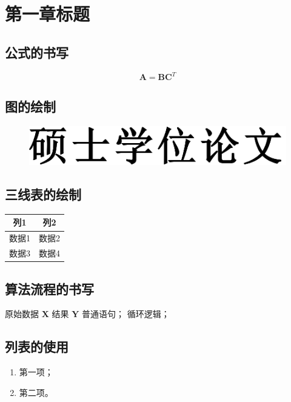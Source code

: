 \chapter{第一章标题}\label{chap:1}

\section{公式的书写}

\begin{equation}\label{eq:example}
    \mathbf{A} = \mathbf{B} \mathbf{C}^T
\end{equation}

\section{图的绘制}

\begin{figure}[H]
    \centering
    \includegraphics*[width=0.7\linewidth]{Figure/master-hwzs.pdf}
\end{figure}

\section{三线表的绘制}

\begin{table}[H]
    \centering
    \begin{tabular}{cc}
        \hline
        列1  & 列2  \\
        \hline
        数据1 & 数据2 \\
        数据3 & 数据4 \\
        \hline
    \end{tabular}
\end{table}

\section{算法流程的书写}

\begin{algorithm}[H]
    \centering
    \begin{algorithmic}[1]
        \Require 原始数据 $\mathbf{X}$
        \Ensure 结果 $\mathbf{Y}$
        \State 普通语句；
        \EndFor
        \State 循环逻辑；
    \end{algorithmic}
\end{algorithm}

\section{列表的使用}

\begin{enumerate}
    \item 第一项；
    \item 第二项。
\end{enumerate}